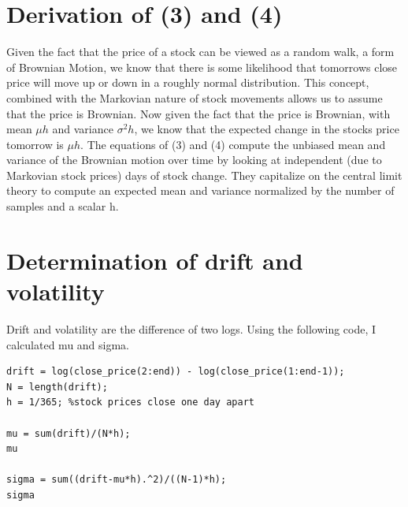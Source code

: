 \documentclass[]{article}
\author{Braden Fineberg}
\begin{document}
	

 

\section{Derivation of (3) and (4)}

Given the fact that the price of a stock can be viewed as a random walk, a form of Brownian Motion, we know that there is some likelihood that tomorrows close price will move up or down in a roughly normal distribution. This concept, combined with the Markovian nature of stock movements allows us to assume that the price is Brownian. Now given the fact that the price is Brownian, with mean $\mu h$ and variance $\sigma^2 h$, we know that the expected change in the stocks price tomorrow is $\mu h$. The equations of (3) and (4) compute the unbiased mean and variance of the Brownian motion over time by looking at independent (due to Markovian stock prices) days of stock change. They capitalize on the central limit theory to compute an expected mean and variance normalized by the number of samples and a scalar h.

\section{Determination of drift and volatility}
Drift and volatility are the difference of two logs. Using the following code, I calculated mu and sigma.

\begin{lstlisting}
drift = log(close_price(2:end)) - log(close_price(1:end-1));
N = length(drift);
h = 1/365; %stock prices close one day apart

mu = sum(drift)/(N*h);
mu

sigma = sum((drift-mu*h).^2)/((N-1)*h);
sigma
\end{lstlisting}
\end{document}
